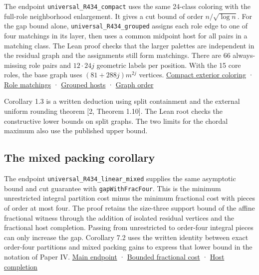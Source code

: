 \documentclass[english,11pt,a4paper]{article}
\begin{document}
The endpoint \texttt{universal\_R434\_compact} uses the same 24-class coloring with the full-role neighborhood enlargement. It gives a cut bound of order \(n/\sqrt{\log n}\). For the gap bound alone, \texttt{universal\_R434\_grouped} assigns each role edge to one of four matchings in its layer, then uses a common midpoint host for all pairs in a matching class. The Lean proof checks that the larger palettes are independent in the residual graph and the assignments still form matchings. There are 66 always-missing role pairs and \(12\cdot24j\) geometric labels per position. With the 15 core roles, the base graph uses \((81+288j)m^{2j}\) vertices. \href{https://github.com/jtraverso/split-clique-partition-gap/blob/ccb5444b2ecdff9de1d6221133633a25a224953d/R434/EHPSCompactExterior.lean}{Compact exterior coloring} · \href{https://github.com/jtraverso/split-clique-partition-gap/blob/ccb5444b2ecdff9de1d6221133633a25a224953d/R434/RoleMatchings.lean}{Role matchings} · \href{https://github.com/jtraverso/split-clique-partition-gap/blob/ccb5444b2ecdff9de1d6221133633a25a224953d/R434/GroupedHosts.lean}{Grouped hosts} · \href{https://github.com/jtraverso/split-clique-partition-gap/blob/ccb5444b2ecdff9de1d6221133633a25a224953d/R434/GroupedGap.lean}{Graph order}

Corollary 1.3 is a written deduction using split containment and the external uniform rounding theorem {[}2, Theorem 1.10{]}. The Lean root checks the constructive lower bounds on split graphs. The two limits for the chordal maximum also use the published upper bound.

\subsection{The mixed packing corollary}\label{the-mixed-packing-corollary}

The endpoint \texttt{universal\_R434\_linear\_mixed} supplies the same asymptotic bound and cut guarantee with \texttt{gapWithFracFour}. This is the minimum unrestricted integral partition cost minus the minimum fractional cost with pieces of order at most four. The proof retains the size-three support bound of the affine fractional witness through the addition of isolated residual vertices and the fractional host completion. Passing from unrestricted to order-four integral pieces can only increase the gap. Corollary 7.2 uses the written identity between exact order-four partitions and mixed packing gains to express that lower bound in the notation of Paper IV. \href{https://github.com/jtraverso/split-clique-partition-gap/blob/ccb5444b2ecdff9de1d6221133633a25a224953d/R434/PolylogGap.lean}{Main endpoint} · \href{https://github.com/jtraverso/split-clique-partition-gap/blob/ccb5444b2ecdff9de1d6221133633a25a224953d/GapExtremal/Completion.lean}{Bounded fractional cost} · \href{https://github.com/jtraverso/split-clique-partition-gap/blob/ccb5444b2ecdff9de1d6221133633a25a224953d/GapExtremal/Bridge.lean}{Host completion}
\end{document}
